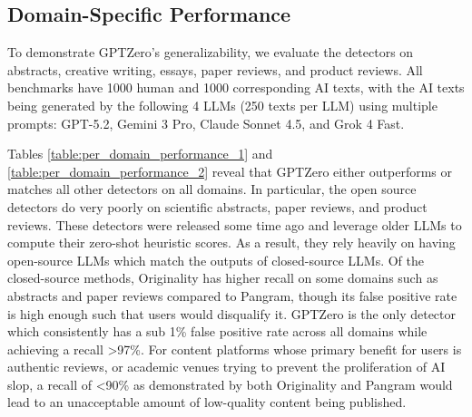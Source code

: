 \documentclass[11pt]{article}
\newcommand{\originality}{Originality}
\newcommand{\pangram}{Pangram}
\newcommand{\gptzero}{GPTZero}
\begin{document}

\subsection{Domain-Specific Performance}
To demonstrate \gptzero{}'s generalizability, we evaluate the detectors on abstracts, creative writing, essays, paper reviews, and product reviews. All benchmarks have 1000 human and 1000 corresponding AI texts, with the AI texts being generated by the following 4 LLMs (250 texts per LLM) using multiple prompts: GPT-5.2, Gemini 3 Pro, Claude Sonnet 4.5, and Grok 4 Fast. 

Tables \ref{table:per_domain_performance_1} and \ref{table:per_domain_performance_2} reveal that \gptzero{} either outperforms or matches all other detectors on all domains. In particular, the open source detectors do very poorly on scientific abstracts, paper reviews, and product reviews. These detectors were released some time ago and leverage older LLMs to compute their zero-shot heuristic scores. As a result, they rely heavily on having open-source LLMs which match the outputs of closed-source LLMs. Of the closed-source methods, \originality{} has higher recall on some domains such as abstracts and paper reviews compared to \pangram, though its false positive rate is high enough such that users would disqualify it. \gptzero{} is the only detector which consistently has a sub 1\% false positive rate across all domains while achieving a recall >97\%. For content platforms whose primary benefit for users is authentic reviews, or academic venues trying to prevent the proliferation of AI slop, a recall of <90\% as demonstrated by both \originality{} and \pangram{} would lead to an unacceptable amount of low-quality content being published.
\end{document}
